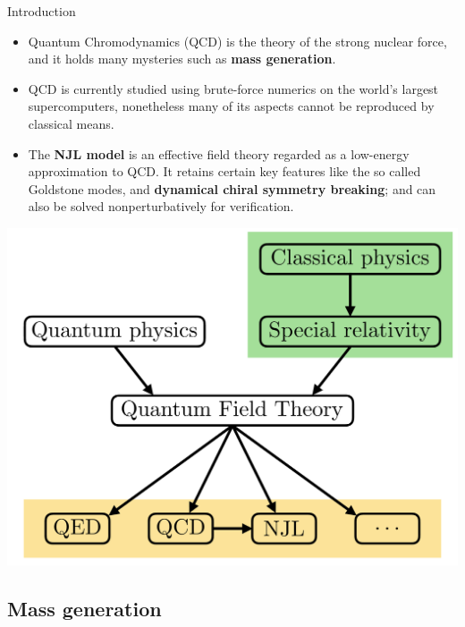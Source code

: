 \documentclass[9pt, handout, aspectratio=169]{beamer}	%
\begin{document}
\begin{frame}{Introduction}

	\begin{multicols}{2}

		\begin{itemize}
			\item<2-> Quantum Chromodynamics (QCD) is the theory of the strong nuclear force, and it holds many mysteries such as \textbf{mass generation}.
			\item<2-> QCD is currently studied using brute-force numerics on the world’s largest supercomputers, nonetheless many of its aspects cannot be reproduced by classical means.
			\item<3-> The \textbf{NJL model} is an effective field theory regarded as a low-energy approximation to QCD. It retains certain key features like the so called Goldstone modes, and \textbf{dynamical chiral symmetry breaking}; and can also be solved nonperturbatively for verification.
		\end{itemize}

		\begin{center}
			\includegraphics[width=.40\paperwidth]{Figures/quantum-field-theory}
		\end{center}

	\end{multicols}

\end{frame}


\subsection{Mass generation}
\end{document}

